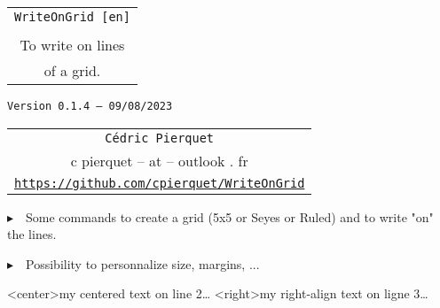 \documentclass[a4paper]{article}
\def\TPversion{0.1.4}
\def\TPdate{09/08/2023}
\begin{document}
\pagestyle{fancy}

\thispagestyle{empty}

\vspace{2cm}

\begin{center}
	\begin{minipage}{0.75\linewidth}
	\begin{tcolorbox}[colframe=yellow,colback=yellow!15]
		\begin{center}
			\begin{tabular}{c}
				{\Huge \texttt{WriteOnGrid [en]}}\\
				\\
				{\LARGE To write on lines} \\
				{\LARGE of a grid.}
			\end{tabular}
			
			\medskip
			
			{\small \texttt{Version \TPversion{} -- \TPdate}}
		\end{center}
	\end{tcolorbox}
\end{minipage}
\end{center}

\vspace{0.5cm}

\begin{center}
	\begin{tabular}{c}
	\texttt{Cédric Pierquet}\\
	{\ttfamily c pierquet -- at -- outlook . fr}\\
	\texttt{\url{https://github.com/cpierquet/WriteOnGrid}}
\end{tabular}
\end{center}

\vspace{0.5cm}

{$\blacktriangleright$~~Some commands to create a grid (5x5 or Seyes or Ruled) and to write "on" the lines.}

\smallskip

{$\blacktriangleright$~~Possibility to personnalize size, margins, ...}

\vspace{1cm}

\begin{center}
	\begin{EnvGrid}[NumSquares=22x8]
	\WriteLine<center>{my centered text on line 2\ldots}
	\WriteLine<right>{my right-align text on ligne 3\ldots}
	\PassLine
\end{EnvGrid}
\end{center}
\end{document}
